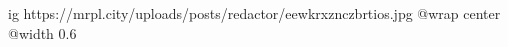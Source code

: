  
 
 
 
 

\ifcmt
  ig https://mrpl.city/uploads/posts/redactor/eewkrxznczbrtios.jpg
  @wrap center
  @width 0.6
\fi
